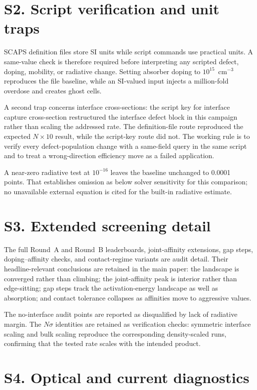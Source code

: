 \documentclass[11pt,a4paper]{article}
\begin{document}
\section*{S2. Script verification and unit traps}

SCAPS definition files store SI units while script commands use practical units. A same-value check is therefore required before interpreting any scripted defect, doping, mobility, or radiative change. Setting absorber doping to $10^{15}$~cm$^{-3}$ reproduces the file baseline, while an SI-valued input injects a million-fold overdose and creates ghost cells.

A second trap concerns interface cross-sections: the script key for interface capture cross-section restructured the interface defect block in this campaign rather than scaling the addressed rate. The definition-file route reproduced the expected $N\times10$ result, while the script-key route did not. The working rule is to verify every defect-population change with a same-field query in the same script and to treat a wrong-direction efficiency move as a failed application.

A near-zero radiative test at $10^{-16}$ leaves the baseline unchanged to 0.0001 points. That establishes omission as below solver sensitivity for this comparison; no unavailable external equation is cited for the built-in radiative estimate.

\section*{S3. Extended screening detail}

The full Round~A and Round~B leaderboards, joint-affinity extensions, gap steps, doping--affinity checks, and contact-regime variants are audit detail. Their headline-relevant conclusions are retained in the main paper: the landscape is converged rather than climbing; the joint-affinity peak is interior rather than edge-sitting; gap steps track the activation-energy landscape as well as absorption; and contact tolerance collapses as affinities move to aggressive values.

The no-interface audit points are reported as disqualified by lack of radiative margin. The $N\sigma$ identities are retained as verification checks: symmetric interface scaling and bulk scaling reproduce the corresponding density-scaled runs, confirming that the tested rate scales with the intended product.

\section*{S4. Optical and current diagnostics}
\end{document}
